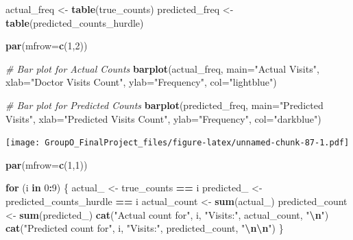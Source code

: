 \documentclass[
]{article}
\newenvironment{Shaded}{\begin{snugshade}}{\end{snugshade}}
\newcommand{\AttributeTok}[1]{\textcolor[rgb]{0.13,0.29,0.53}{#1}}
\newcommand{\CommentTok}[1]{\textcolor[rgb]{0.56,0.35,0.01}{\textit{#1}}}
\newcommand{\ControlFlowTok}[1]{\textcolor[rgb]{0.13,0.29,0.53}{\textbf{#1}}}
\newcommand{\DecValTok}[1]{\textcolor[rgb]{0.00,0.00,0.81}{#1}}
\newcommand{\FunctionTok}[1]{\textcolor[rgb]{0.13,0.29,0.53}{\textbf{#1}}}
\newcommand{\NormalTok}[1]{#1}
\newcommand{\OtherTok}[1]{\textcolor[rgb]{0.56,0.35,0.01}{#1}}
\newcommand{\SpecialCharTok}[1]{\textcolor[rgb]{0.81,0.36,0.00}{\textbf{#1}}}
\newcommand{\StringTok}[1]{\textcolor[rgb]{0.31,0.60,0.02}{#1}}
\begin{document}
\begin{Shaded}
\begin{Highlighting}[]
\NormalTok{actual\_freq }\OtherTok{\textless{}{-}} \FunctionTok{table}\NormalTok{(true\_counts)}
\NormalTok{predicted\_freq }\OtherTok{\textless{}{-}} \FunctionTok{table}\NormalTok{(predicted\_counts\_hurdle)}

\FunctionTok{par}\NormalTok{(}\AttributeTok{mfrow=}\FunctionTok{c}\NormalTok{(}\DecValTok{1}\NormalTok{,}\DecValTok{2}\NormalTok{))}

\CommentTok{\# Bar plot for Actual Counts}
\FunctionTok{barplot}\NormalTok{(actual\_freq, }\AttributeTok{main=}\StringTok{"Actual Visits"}\NormalTok{, }\AttributeTok{xlab=}\StringTok{"Doctor Visits Count"}\NormalTok{,}
        \AttributeTok{ylab=}\StringTok{"Frequency"}\NormalTok{, }\AttributeTok{col=}\StringTok{"lightblue"}\NormalTok{)}

\CommentTok{\# Bar plot for Predicted Counts}
\FunctionTok{barplot}\NormalTok{(predicted\_freq, }\AttributeTok{main=}\StringTok{"Predicted Visits"}\NormalTok{, }\AttributeTok{xlab=}\StringTok{"Predicted Visits Count"}\NormalTok{, }
        \AttributeTok{ylab=}\StringTok{"Frequency"}\NormalTok{, }\AttributeTok{col=}\StringTok{"darkblue"}\NormalTok{)}
\end{Highlighting}
\end{Shaded}

\texttt{[image: GroupO\_FinalProject\_files/figure-latex/unnamed-chunk-87-1.pdf]}

\begin{Shaded}
\begin{Highlighting}[]
\FunctionTok{par}\NormalTok{(}\AttributeTok{mfrow=}\FunctionTok{c}\NormalTok{(}\DecValTok{1}\NormalTok{,}\DecValTok{1}\NormalTok{))}

\ControlFlowTok{for}\NormalTok{ (i }\ControlFlowTok{in} \DecValTok{0}\SpecialCharTok{:}\DecValTok{9}\NormalTok{) \{}
\NormalTok{  actual\_ }\OtherTok{\textless{}{-}}\NormalTok{ true\_counts }\SpecialCharTok{==}\NormalTok{ i}
\NormalTok{  predicted\_ }\OtherTok{\textless{}{-}}\NormalTok{ predicted\_counts\_hurdle }\SpecialCharTok{==}\NormalTok{ i}
\NormalTok{  actual\_count }\OtherTok{\textless{}{-}} \FunctionTok{sum}\NormalTok{(actual\_)}
\NormalTok{  predicted\_count }\OtherTok{\textless{}{-}} \FunctionTok{sum}\NormalTok{(predicted\_)}
  \FunctionTok{cat}\NormalTok{(}\StringTok{"Actual count for"}\NormalTok{, i, }\StringTok{"Visits:"}\NormalTok{, actual\_count, }\StringTok{"}\SpecialCharTok{\textbackslash{}n}\StringTok{"}\NormalTok{)}
  \FunctionTok{cat}\NormalTok{(}\StringTok{"Predicted count for"}\NormalTok{, i, }\StringTok{"Visits:"}\NormalTok{, predicted\_count, }\StringTok{"}\SpecialCharTok{\textbackslash{}n\textbackslash{}n}\StringTok{"}\NormalTok{)}
\NormalTok{\}}
\end{Highlighting}
\end{Shaded}
\end{document}
